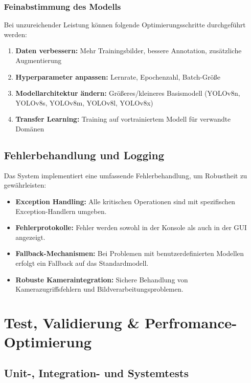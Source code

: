 \documentclass[12pt, a4paper]{scrreprt}
\begin{document}
\subsection{Feinabstimmung des Modells}
Bei unzureichender Leistung können folgende Optimierungsschritte durchgeführt werden:
\begin{enumerate}
    \item \textbf{Daten verbessern:} Mehr Trainingsbilder, bessere Annotation, zusätzliche Augmentierung
    \item \textbf{Hyperparameter anpassen:} Lernrate, Epochenzahl, Batch-Größe
    \item \textbf{Modellarchitektur ändern:} Größeres/kleineres Basismodell (YOLOv8n, YOLOv8s, YOLOv8m, YOLOv8l, YOLOv8x)
    \item \textbf{Transfer Learning:} Training auf vortrainiertem Modell für verwandte Domänen
\end{enumerate}

\section{Fehlerbehandlung und Logging}
Das System implementiert eine umfassende Fehlerbehandlung, um Robustheit zu gewährleisten:

\begin{itemize}
    \item \textbf{Exception Handling:} Alle kritischen Operationen sind mit spezifischen Exception-Handlern umgeben.
    \item \textbf{Fehlerprotokolle:} Fehler werden sowohl in der Konsole als auch in der GUI angezeigt.
    \item \textbf{Fallback-Mechanismen:} Bei Problemen mit benutzerdefinierten Modellen erfolgt ein Fallback auf das Standardmodell.
    \item \textbf{Robuste Kameraintegration:} Sichere Behandlung von Kamerazugriffsfehlern und Bildverarbeitungsproblemen.
\end{itemize}

\chapter{Test, Validierung \& Perfromance-Optimierung}

\section{Unit-, Integration- und Systemtests}
\end{document}

